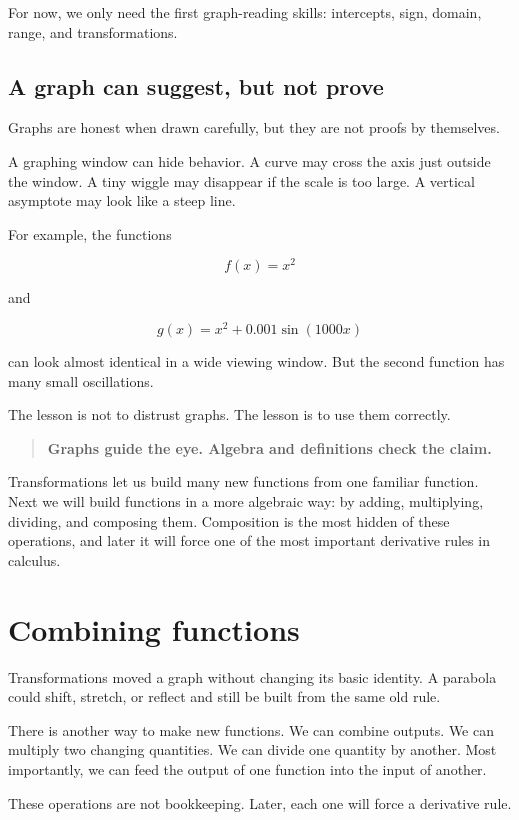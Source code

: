 For now, we only need the first graph-reading skills: intercepts, sign, domain, range, and transformations.

\subsection{A graph can suggest, but not prove}
\label{subsec:graph-suggest-not-prove}

Graphs are honest when drawn carefully, but they are not proofs by themselves.

A graphing window can hide behavior. A curve may cross the axis just outside the window. A tiny wiggle may disappear if the scale is too large. A vertical asymptote may look like a steep line.

For example, the functions

\[
f(x)=x^2
\]

and

\[
g(x)=x^2+0.001\sin(1000x)
\]

can look almost identical in a wide viewing window. But the second function has many small oscillations.

The lesson is not to distrust graphs. The lesson is to use them correctly.

\begin{quote}
\textbf{Graphs guide the eye. Algebra and definitions check the claim.}
\end{quote}

Transformations let us build many new functions from one familiar function. Next we will build functions in a more algebraic way: by adding, multiplying, dividing, and composing them. Composition is the most hidden of these operations, and later it will force one of the most important derivative rules in calculus.
\section{Combining functions}
\label{sec:combining-functions}

Transformations moved a graph without changing its basic identity. A parabola could shift, stretch, or reflect and still be built from the same old rule.

There is another way to make new functions. We can combine outputs. We can multiply two changing quantities. We can divide one quantity by another. Most importantly, we can feed the output of one function into the input of another.

These operations are not bookkeeping. Later, each one will force a derivative rule.

